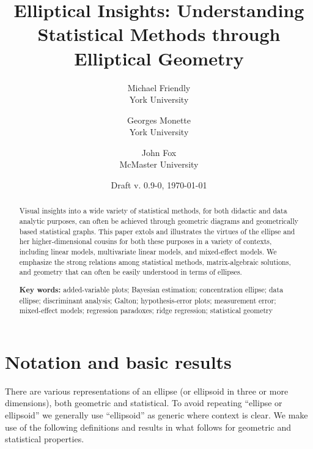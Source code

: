 \documentclass[11pt]{article}%
\newcommand{\keywords}[1]{\par\noindent\textbf{Key words:} #1}
\begin{document}
\begin{titlepage}
\title{Elliptical Insights: Understanding Statistical Methods through Elliptical Geometry}

\author{Michael Friendly%
 \\ York University
\and
Georges Monette \\ York University
\and
John Fox \\ McMaster University
}
\date{Draft v. 0.9-0, \today}
\end{titlepage}
\maketitle

\begin{abstract}
Visual insights into  a wide variety  of statistical methods,  for both didactic
and data analytic purposes, can often be achieved through geometric diagrams  and
geometrically based statistical graphs.  This  paper extols and illustrates  the
virtues  of  the  ellipse  and her  higher-dimensional  cousins  for  both these
purposes in a variety of contexts, including linear models, multivariate
linear models, and mixed-effect models.
We emphasize the strong relations among statistical methods, matrix-algebraic
solutions, and geometry that can often be easily understood in terms of
ellipses.

\keywords{
added-variable plots;
Bayesian estimation;
concentration ellipse;
data ellipse;
discriminant analysis;
Galton;
hypothesis-error plots;
measurement error;
mixed-effect models;
regression paradoxes;
ridge regression;
statistical geometry
}
\end{abstract}



\section{Notation and basic results}

There are various representations of an ellipse (or ellipsoid in three or more dimensions),
both geometric and statistical.
To avoid repeating ``ellipse or ellipsoid'' we generally use ``ellipsoid'' as generic where context is clear.
We make use of the following definitions and results in what follows for geometric and
statistical properties.
\end{document}
